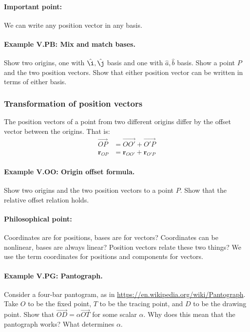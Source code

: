 \documentclass{article}
\renewcommand{\vec}[1]{\boldsymbol{#1}}
\begin{document}
\paragraph{Important point:} We can write any position vector in any
basis.

\paragraph{Example V.PB: Mix and match bases.} Show two origins, one with
$\hat\i,\hat\j$ basis and one with $\hat{a},\hat{b}$ basis. Show a
point $P$ and the two position vectors. Show that either position
vector can be written in terms of either basis.

\subsubsection{Transformation of position vectors}

The position vectors of a point from two different origins differ by
the offset vector between the origins. That is:
\begin{align}
  \overrightarrow{OP} &= \overrightarrow{OO'} + \overrightarrow{O'P} \\
  \vec{r}_{OP} &= \vec{r}_{OO'} + \vec{r}_{O'P}
\end{align}

\paragraph{Example V.OO: Origin offset formula.} Show two origins and the
two position vectors to a point $P$. Show that the relative offset
relation holds.

\paragraph{Philosophical point:} Coordinates are for positions, bases
are for vectors? Coordinates can be nonlinear, bases are always
linear?  Position vectors relate these two things? We use the term
coordinates for positions and components for vectors.

\paragraph{Example V.PG: Pantograph.} Consider a four-bar pantogram,
as in \url{https://en.wikipedia.org/wiki/Pantograph}. Take $O$ to be
the fixed point, $T$ to be the tracing point, and $D$ to be the
drawing point. Show that $\overrightarrow{OD} = \alpha
\overrightarrow{OT}$ for some scalar $\alpha$. Why does this mean that
the pantograph works? What determines $\alpha$.
\end{document}
